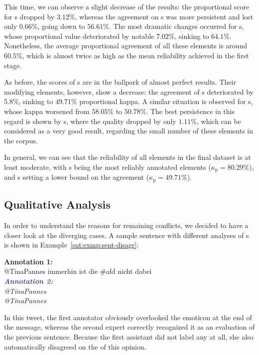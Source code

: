 This time, we can observe a slight decrease of the results: the
proportional score for s dropped by $3.12\%$,
whereas the agreement on s was more persistent and
lost only $0.66\%$, going down to $56.61\%$.  The most dramatic
changes occurred for s, whose proportional value
deteriorated by notable $7.02\%$, sinking to $64.1\%$.  Nonetheless,
the average proportional agreement of all these elements is around
$60.5\%$, which is almost twice as high as the mean reliability
achieved in the first stage.

As before, the scores of s are in the ballpark of
almost perfect results.  Their modifying elements, however, show a
decrease: the agreement of s deteriorated by
5.8\%, sinking to 49.71\% proportional kappa.  A similar situation is
observed for s, whose kappa worsened from
$58.05\%$ to $50.78\%$.  The best persistence in this regard is shown
by s, where the quality dropped by only $1.11\%$,
which can be considered as a very good result, regarding the small
number of these elements in the corpus.

In general, we can see that the reliability of all elements in the
final dataset is at least moderate, with s being
the most reliably annotated elements ($\kappa_{\textrm{p}}=80.29\%$),
and s setting a lower bound on the agreement
($\kappa_{\textrm{p}}=49.71\%$).

\subsection{Qualitative Analysis}\label{subsec:eval-qualitative-analysis}

In order to understand the reasons for remaining conflicts, we decided
to have a closer look at the diverging cases.  A sample sentence with
different analyses of s is shown in
Example~\ref{snt:exmp:sent-disagr}:
\begin{example}\label{snt:exmp:sent-disagr}
  \textcolor{red3}{\textbf{Annotation 1:}}\\ \upshape{}@TinaPannes
  immerhin ist die \#afd nicht dabei \smiley{}\\[0.8em]\itshape
  \noindent\textcolor{darkslateblue}{\textbf{\itshape Annotation
      2:}}\\ \upshape{}@TinaPannes
  \\[0.8em]
  \noindent\itshape{}@TinaPannes
  \upshape{}
\end{example}
In this tweet, the first annotator obviously overlooked the emoticon
\smiley{} at the end of the message, whereas the second expert
correctly recognized it as an evaluation of the previous sentence.
Because the first assistant did not label any  at
all, she also automatically disagreed on the  of this
opinion.

